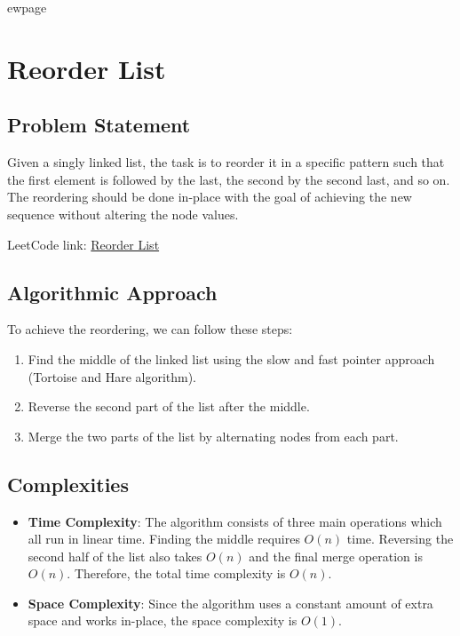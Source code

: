 
ewpage

\chapter{Reorder List}
\label{chap:reorder_list}

\section*{Problem Statement}

Given a singly linked list, the task is to reorder it in a specific pattern such that the first element is followed by the last, the second by the second last, and so on. The reordering should be done in-place with the goal of achieving the new sequence without altering the node values.

LeetCode link: \href{https://leetcode.com/problems/reorder-list}{Reorder List}

\section*{Algorithmic Approach}

To achieve the reordering, we can follow these steps:
\begin{enumerate}
    \item Find the middle of the linked list using the slow and fast pointer approach (Tortoise and Hare algorithm). 
    \item Reverse the second part of the list after the middle.
    \item Merge the two parts of the list by alternating nodes from each part.
\end{enumerate}

\section*{Complexities}

\begin{itemize}
    \item \textbf{Time Complexity}: The algorithm consists of three main operations which all run in linear time. Finding the middle requires $O(n)$ time. Reversing the second half of the list also takes $O(n)$ and the final merge operation is $O(n)$. Therefore, the total time complexity is $O(n)$.
    \item \textbf{Space Complexity}: Since the algorithm uses a constant amount of extra space and works in-place, the space complexity is $O(1)$.
\end{itemize}


